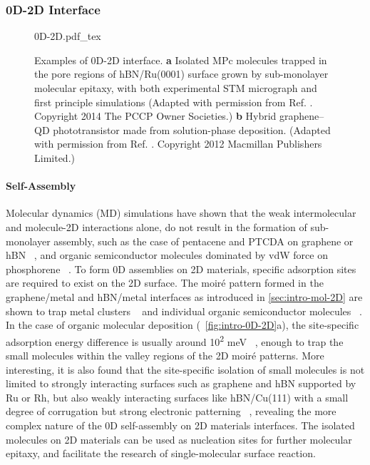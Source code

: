\subsubsection{0D-2D Interface}
\label{sec:intro-0D-2D}

\begin{figure}[h]
  \centering
  {0D-2D.pdf_tex}
  \caption{\label{fig:intro-0D-2D}%
    Examples of 0D-2D interface. \textbf{a} Isolated MPc molecules
    trapped in the pore regions of hBN/Ru(0001) surface grown by
    sub-monolayer molecular epitaxy, with both experimental STM
    micro\-graph and first principle simulations (Adapted with
    permission from
    Ref. . Copyright 2014 The PCCP
    Owner Societies.)  \textbf{b} Hybrid graphene–QD photo\-transistor
    made from solution-phase deposition. (Adapted with permission from
    Ref. \cite{Konstantatos_2012_QD_gr_trans}. Copyright 2012
    Macmillan Publishers Limited.)%
  }
\end{figure}

\paragraph{Self-Assembly}
\label{sec:org8117691}

Molecular dynamics (MD) simulations have shown that the weak
intermolecular and molecule-2D interactions alone, do not result in
the formation of sub-monolayer assembly, such as the case of pentacene
and PTCDA on graphene or hBN ~\cite{Zhao_2015_self_assemb_gr_MD}, and
organic semiconductor molecules dominated by vdW force on phosphorene
~\cite{Mukhopadhyay_2017_cryst_BP}.
% 
To form 0D assemblies on 2D materials, specific adsorption sites are
required to exist on the 2D surface.
% 
The moiré pattern formed in the graphene/metal and hBN/metal
interfaces as introduced in \autoref{sec:intro-mol-2D} are shown to
trap metal clusters
~\cite{Goriachko_2007_assembl_hBN_ru,Pan_2009_Pt_cluster_gr,Wang_2011_gr_hBN_metal_cl,Zhang_2014_metal_gr_Ru}
and individual organic semiconductor molecules
~\cite{Joshi_2014_TCNQ_hBN,Dil_2008_hBN_Rh,Lu_2012_c60_gr_moire}.
%
In the case of organic molecular deposition
(~\autoref{fig:intro-0D-2D}a), the site-specific adsorption energy
difference is usually around 10\textsuperscript{2} meV
~\cite{Lu_2012_c60_gr_moire,Iannuzzi_2014_MPc_hBN_Rh}, enough to trap
the small molecules within the valley regions of the 2D moiré
patterns. More interesting, it is also found that the site-specific
isolation of small molecules is not limited to strongly interacting
surfaces such as graphene and hBN supported by Ru or Rh, but also
weakly interacting surfaces like hBN/Cu(111) with a small degree of
corrugation but strong electronic patterning
~\cite{Joshi_2012_hBN_Cu,Joshi_2014_TCNQ_hBN}, revealing the more
complex nature of the 0D self-assembly on 2D materials interfaces.
%
The isolated molecules on 2D materials can be used as nucleation sites
for further molecular epitaxy, and facilitate the research of
single-molecular surface reaction.


